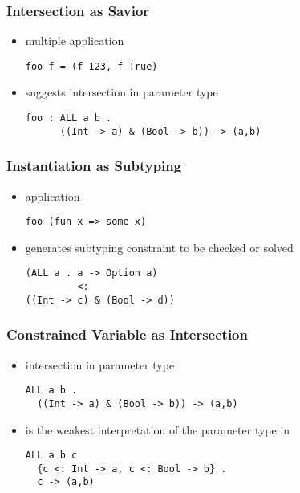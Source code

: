 \documentclass{beamer}
\begin{document}
\begin{frame}[fragile]
  \frametitle{Intersection as Savior}

  \begin{itemize}
  \item multiple application
  \begin{lstlisting}
foo f = (f 123, f True)
  \end{lstlisting}
  \item suggests intersection in parameter type  
  \begin{lstlisting}
foo : ALL a b . 
      ((Int -> a) & (Bool -> b)) -> (a,b)
  \end{lstlisting}
  \end{itemize}
\end{frame}


\begin{frame}[fragile]
  \frametitle{Instantiation as Subtyping}

  \begin{itemize}
  \item application 
  \begin{lstlisting}
foo (fun x => some x)
  \end{lstlisting}
  \item generates subtyping constraint to be checked or solved 
  \begin{lstlisting}
(ALL a . a -> Option a) 
         <: 
((Int -> c) & (Bool -> d))
  \end{lstlisting}
  \end{itemize}
\end{frame}


\begin{frame}[fragile]
  \frametitle{Constrained Variable as Intersection}
  \begin{itemize}
  \item intersection in parameter type 
  \begin{lstlisting}
ALL a b . 
  ((Int -> a) & (Bool -> b)) -> (a,b)
  \end{lstlisting}
  \item is the weakest interpretation of the parameter type in 
  \begin{lstlisting}
ALL a b c 
  {c <: Int -> a, c <: Bool -> b} . 
  c -> (a,b)
  \end{lstlisting}
  \end{itemize}
\end{frame}
\end{document}
